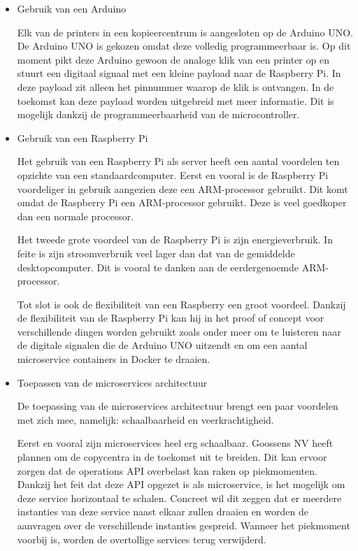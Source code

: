 \begin{itemize}
    \item Gebruik van een Arduino
    
    Elk van de printers in een kopieercentrum is aangesloten op de Arduino UNO. De Arduino UNO is gekozen omdat deze volledig programmeerbaar is. Op dit moment pikt deze Arduino gewoon de analoge klik van een printer op en stuurt een digitaal signaal met een kleine payload naar de Raspberry Pi. In deze payload zit alleen het pinnummer waarop de klik is ontvangen. In de toekomst kan deze payload worden uitgebreid met meer informatie. Dit is mogelijk dankzij de programmeerbaarheid van de microcontroller.
    
    \item Gebruik van een Raspberry Pi
    
    Het gebruik van een Raspberry Pi als server heeft een aantal voordelen ten opzichte van een standaardcomputer.
    Eerst en vooral is de Raspberry Pi voordeliger in gebruik aangezien deze een ARM-processor gebruikt. Dit komt omdat de Raspberry Pi een ARM-processor gebruikt. Deze is veel goedkoper dan een normale processor.
    
    Het tweede grote voordeel van de Raspberry Pi is zijn energieverbruik. In feite is zijn stroomverbruik veel lager dan dat van de gemiddelde desktopcomputer. Dit is vooral te danken aan de eerdergenoemde ARM-processor.
    
    Tot slot is ook de flexibiliteit van een Raspberry een groot voordeel. Dankzij de flexibiliteit van de Raspberry Pi kan hij in het proof of concept voor verschillende dingen worden gebruikt zoals onder meer om te luisteren naar de digitale signalen die de Arduino UNO uitzendt en om een aantal microservice containers in Docker te draaien.
    
    \item Toepassen van de microservices architectuur
    
    De toepassing van de microservices architectuur brengt een paar voordelen met zich mee, namelijk: schaalbaarheid en veerkrachtigheid.
    
    Eerst en vooral zijn microservices heel erg schaalbaar.    
    Goossens NV heeft plannen om de copycentra in de toekomst uit te breiden. Dit kan ervoor zorgen dat de operations API overbelast kan raken op piekmomenten. Dankzij het feit dat deze API opgezet is als microservice, is het mogelijk om deze service horizontaal te schalen. Concreet wil dit zeggen dat er meerdere instanties van deze service naast elkaar zullen draaien en worden de aanvragen over de verschillende instanties gespreid. Wanneer het piekmoment voorbij is, worden de overtollige services terug verwijderd.
    

\end{itemize}
